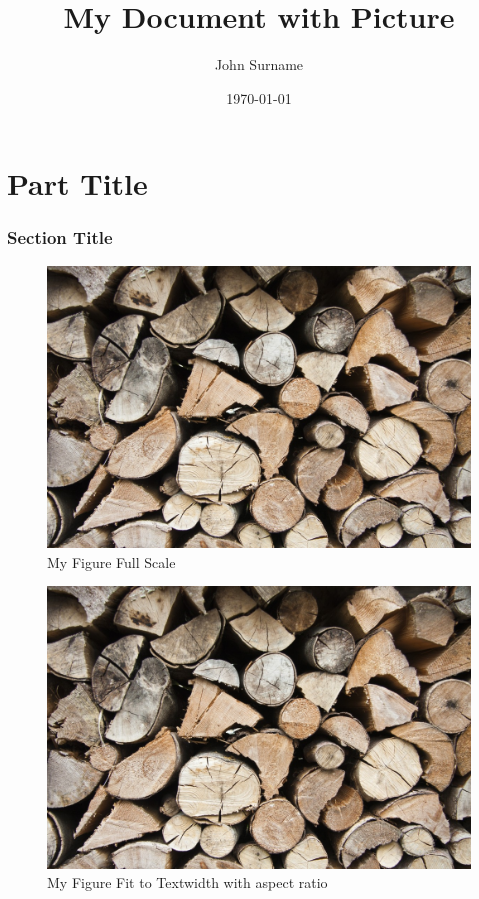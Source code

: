 \documentclass{article}
\author{John Surname}
\date{\today}
\title{My Document with Picture}
\begin{document}
\maketitle

\part{Part Title}

\blindtext


\blindtext
\section{Section Title}

\blindtext
\begin{figure}[t]
  \centering
  \includegraphics[scale=1.0]{eximg01.jpeg}
  \caption{My Figure Full Scale}
  \label{fig:My Fig Full}
\end{figure}

\FloatBarrier


\begin{figure}[t]
  \centering
  \includegraphics[width=\textwidth, keepaspectratio]{eximg01.jpeg}
  \caption{My Figure Fit to Textwidth with aspect ratio}
  \label{fig:My Fig Full}
\end{figure}
\end{document}
